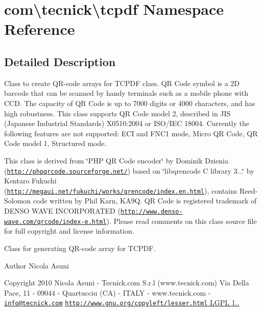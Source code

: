 \hypertarget{namespacecom_1_1tecnick_1_1tcpdf}{\section{com\textbackslash{}tecnick\textbackslash{}tcpdf Namespace Reference}
\label{namespacecom_1_1tecnick_1_1tcpdf}
}


\subsection{Detailed Description}
Class to create Q\-R-\/code arrays for T\-C\-P\-D\-F class. Q\-R Code symbol is a 2\-D barcode that can be scanned by handy terminals such as a mobile phone with C\-C\-D. The capacity of Q\-R Code is up to 7000 digits or 4000 characters, and has high robustness. This class supports Q\-R Code model 2, described in J\-I\-S (Japanese Industrial Standards) X0510\-:2004 or I\-S\-O/\-I\-E\-C 18004. Currently the following features are not supported\-: E\-C\-I and F\-N\-C1 mode, Micro Q\-R Code, Q\-R Code model 1, Structured mode.

This class is derived from \char`\"{}\-P\-H\-P Q\-R Code encoder\char`\"{} by Dominik Dzienia (\href{http://phpqrcode.sourceforge.net/}{\tt http\-://phpqrcode.\-sourceforge.\-net/}) based on \char`\"{}libqrencode C library 3...\char`\"{} by Kentaro Fukuchi (\href{http://megaui.net/fukuchi/works/qrencode/index.en.html}{\tt http\-://megaui.\-net/fukuchi/works/qrencode/index.\-en.\-html}), contains Reed-\/\-Solomon code written by Phil Karn, K\-A9\-Q. Q\-R Code is registered trademark of D\-E\-N\-S\-O W\-A\-V\-E I\-N\-C\-O\-R\-P\-O\-R\-A\-T\-E\-D (\href{http://www.denso-wave.com/qrcode/index-e.html}{\tt http\-://www.\-denso-\/wave.\-com/qrcode/index-\/e.\-html}). Please read comments on this class source file for full copyright and license information.

Class for generating Q\-R-\/code array for T\-C\-P\-D\-F. \begin{DoxyAuthor}{Author}
Nicola Asuni 
\end{DoxyAuthor}
\begin{DoxyCopyright}{Copyright}
2010 Nicola Asuni -\/ Tecnick.\-com S.\-r.\-l (www.\-tecnick.\-com) Via Della Pace, 11 -\/ 09044 -\/ Quartucciu (C\-A) -\/ I\-T\-A\-L\-Y -\/ www.\-tecnick.\-com -\/ \href{mailto:info@tecnick.com}{\tt info@tecnick.\-com} \hyperlink{}{\href{http://www.gnu.org/copyleft/lesser.html}{\tt http\-://www.\-gnu.\-org/copyleft/lesser.\-html} L\-G\-P\-L  1.. }
\end{DoxyCopyright}
